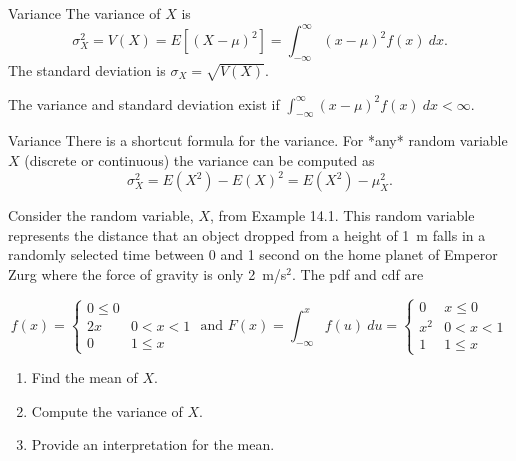\begin{frame}

  \begin{block}{Variance}
    The variance of $X$ is
    \[
      \sigma^2_X=V(X)=E[(X-\mu)^2]=\int_{-\infty}^{\infty}(x-\mu)^2 f(x)~dx.
    \]
    The standard deviation is $\sigma_X=\sqrt{V(X)}$. 
    
    The variance and standard deviation exist if $\int_{-\infty}^{\infty} (x-\mu)^2f(x) ~dx < \infty$.
  \end{block}
\end{frame}

\begin{frame}

  \begin{block}{Variance}
    There is a shortcut formula for the variance. For *any* random variable $X$ (discrete or continuous) the variance can be computed as
    $$
    \sigma^2_X=E(X^2)-E(X)^2=E(X^2)-\mu_X^2.
    $$
  \end{block}
\end{frame}

\begin{frame}
  \begin{block}{\example}
    Consider the random variable, $X$, from Example 14.1. This random variable represents the distance that an object dropped from a height of 1~m falls in a randomly selected time between 0 and 1 second on the home planet of Emperor Zurg where the force of gravity is only 2~m/s$^2$. The pdf and cdf are
    \begin{scriptsize}
      \[
        f(x)=\left\{
          \begin{array}{ll}
            0 \leq 0\\
            2x & 0 < x < 1\\
          0 & 1 \leq x
          \end{array}
        \right.
        \mbox{ and }
        F(x)=\int_{-\infty}^x f(u)~du=
        \left\{
          \begin{array}{ll}
            0 & x \leq 0\\
            x^2 & 0 < x < 1\\
            1 & 1 \leq x
          \end{array}
        \right.
      \]
    \end{scriptsize}
  \end{block}
  
  \begin{enumerate}[label=\alph*),start=1]
  \item Find the mean of $X$.
  \item Compute the variance of $X$.
  \item Provide an interpretation for the mean.
  \end{enumerate}
  
\end{frame}

